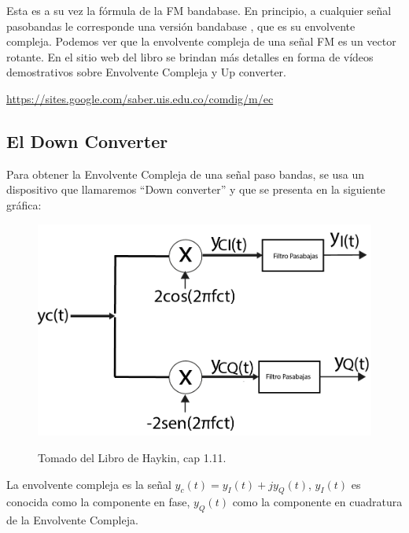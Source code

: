 Esta es a su vez la fórmula de la FM bandabase. En principio, a cualquier señal pasobandas le corresponde una versión bandabase , que es su envolvente compleja. Podemos ver que la envolvente compleja de una señal FM es un vector rotante. En el sitio web del libro se brindan más detalles en forma de vídeos demostrativos sobre Envolvente Compleja y Up converter.\\

\begin{center}
\url{https://sites.google.com/saber.uis.edu.co/comdig/m/ec} 
\end{center}

\subsection{El Down Converter}

Para obtener la Envolvente Compleja de una señal paso bandas, se usa un dispositivo que llamaremos “Down converter” y que se presenta en la siguiente gráfica: \\

\begin{figure}[h!]
	\captionsetup{justification = raggedright, singlelinecheck = false}
	\caption{Tomado del Libro de Haykin, cap 1.11.} 
	\centering
	\includegraphics[scale=0.3]{Imagenes/libro-haykin.png}
	\label{fig:libro-haykin}
\end{figure}

La envolvente compleja es la señal $y_{c}(t) =  y_{I}(t) + j y_{Q}(t)$,  $y_{I}(t)$ es conocida como la componente en fase,  $y_{Q}(t)$ como la componente en cuadratura de la Envolvente Compleja.


